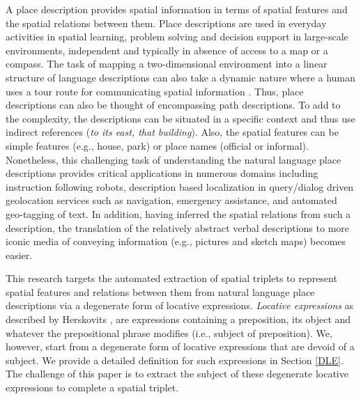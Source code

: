 \documentclass[letter]{sig-alternate}
\begin{document}
A place description provides spatial information in terms of spatial features and the spatial relations between them. Place descriptions are used in everyday activities in spatial learning, problem solving and decision support in large-scale environments, independent and typically in absence of access to a map or a compass. The task of mapping a two-dimensional environment into a linear structure of language descriptions can also take a dynamic nature where a human uses a tour route for communicating spatial information \cite{linde:spatial, daniel:modes}. Thus, place descriptions can also be thought of encompassing path descriptions. To add to the complexity, the descriptions can be situated in a specific context and thus use indirect references (\textit{to its east, that building}). 
Also, the spatial features can be simple features (e.g., house, park) or place names (official or informal). 
Nonetheless, this challenging task of understanding the natural language place descriptions provides critical applications in numerous domains including instruction following robots, description based localization in query/dialog driven geolocation services such as navigation, emergency assistance, and automated geo-tagging of text. In addition, having inferred the spatial relations from such a description, the translation of the relatively abstract verbal descriptions to more iconic media of conveying information (e.g., pictures and sketch maps) becomes easier.

This research targets the automated extraction of spatial triplets to represent spatial features and relations between them from natural language place descriptions via a degenerate form of locative expressions. \textit{Locative expressions} as described by Herskovits \cite{herskovits:pragmatics}, are expressions containing a preposition, its object and whatever the prepositional phrase modifies (i.e., subject of preposition). We, however, start from a degenerate form of locative expressions that are devoid of a subject. We provide a detailed definition for such expressions in Section \ref{DLE}. The challenge of this paper is to extract the subject of these degenerate locative expressions to complete a spatial triplet.
\end{document}
